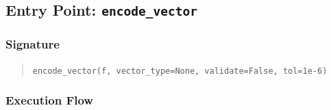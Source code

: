 \documentclass[10pt,twocolumn]{article}
\begin{document}
\subsection{Entry Point: \texttt{encode\_vector}}
\label{app:encode_vector}

\subsubsection*{Signature}

\begin{quote}
\texttt{encode\_vector(f, vector\_type=None, validate=False, tol=1e-6)}
\end{quote}

\subsubsection*{Execution Flow}
\end{document}
